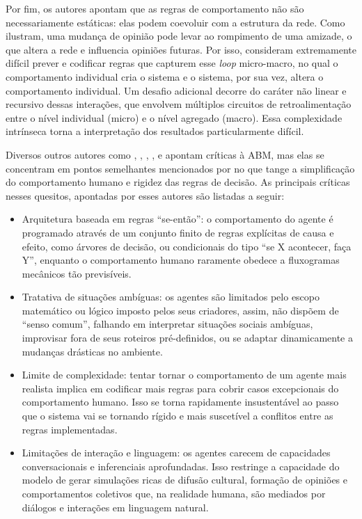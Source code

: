 \documentclass[12pt,oneside,a4paper,brazil,sumario=tradicional]{abntex2}
\begin{document}
Por fim, os autores apontam que as regras de comportamento não são necessariamente estáticas: elas podem coevoluir com a estrutura da rede. Como ilustram, uma mudança de opinião pode levar ao rompimento de uma amizade, o que altera a rede e influencia opiniões futuras. Por isso, consideram extremamente difícil prever e codificar regras que capturem esse \textit{loop} micro-macro, no qual o comportamento individual cria o sistema e o sistema, por sua vez, altera o comportamento individual. Um desafio adicional decorre do caráter não linear e recursivo dessas interações, que envolvem múltiplos circuitos de retroalimentação entre o nível individual (micro) e o nível agregado (macro). Essa complexidade intrínseca torna a interpretação dos resultados particularmente difícil.

Diversos outros autores como \textcite{adornetto2025}, \textcite{chopra2024}, \textcite{gao2023}, \textcite{larooij2025}, e \textcite{park2023} apontam críticas à ABM, mas elas se concentram em pontos semelhantes mencionados por \textcite{namatame2016} no que tange a simplificação do comportamento humano e rigidez das regras de decisão. As principais críticas nesses quesitos, apontadas por esses autores são listadas a seguir:

\begin{itemize}
  \item Arquitetura baseada em regras “se-então”: o comportamento do agente é programado através de um conjunto finito de regras explícitas de causa e efeito, como árvores de decisão, ou condicionais do tipo “se X acontecer, faça Y”, enquanto o comportamento humano raramente obedece a fluxogramas mecânicos tão previsíveis.
  \item Tratativa de situações ambíguas: os agentes são limitados pelo escopo matemático ou lógico imposto pelos seus criadores, assim, não dispõem de “senso comum”, falhando em interpretar situações sociais ambíguas, improvisar fora de seus roteiros pré-definidos, ou se adaptar dinamicamente a mudanças drásticas no ambiente.
  \item Limite de complexidade: tentar tornar o comportamento de um agente mais realista implica em codificar mais regras para cobrir casos excepcionais do comportamento humano. Isso se torna rapidamente insustentável ao passo que o sistema vai se tornando rígido e mais suscetível a conflitos entre as regras implementadas.
  \item Limitações de interação e linguagem: os agentes carecem de capacidades conversacionais e inferenciais aprofundadas. Isso restringe a capacidade do modelo de gerar simulações ricas de difusão cultural, formação de opiniões e comportamentos coletivos que, na realidade humana, são mediados por diálogos e interações em linguagem natural.
\end{itemize}
\end{document}
